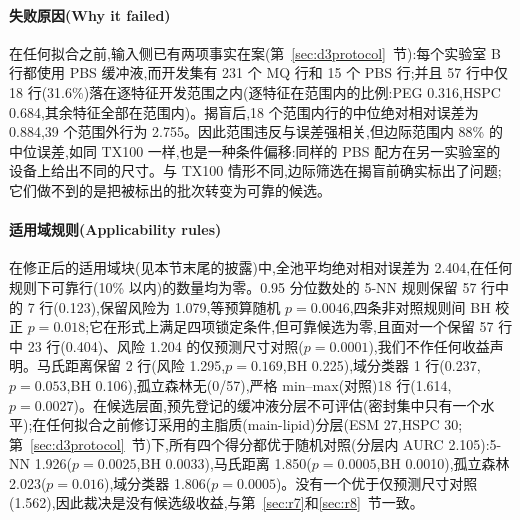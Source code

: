 \documentclass[11pt,a4paper]{ctexart}
\begin{document}
\paragraph{失败原因(Why it failed)} 在任何拟合之前,输入侧已有两项事实在案(第~\ref{sec:d3protocol}~节):每个实验室 B 行都使用 PBS 缓冲液,而开发集有 231 个 MQ 行和 15 个 PBS 行;并且 57 行中仅 18 行(31.6\%)落在逐特征开发范围之内(逐特征在范围内的比例:PEG 0.316,HSPC 0.684,其余特征全部在范围内)。揭盲后,18 个范围内行的中位绝对相对误差为 0.884,39 个范围外行为 2.755。因此范围违反与误差强相关,但边际范围内 88\% 的中位误差,如同 TX100 一样,也是一种条件偏移:同样的 PBS 配方在另一实验室的设备上给出不同的尺寸。与 TX100 情形不同,边际筛选在揭盲前确实标出了问题;它们做不到的是把被标出的批次转变为可靠的候选。

\paragraph{适用域规则(Applicability rules)} 在修正后的适用域块(见本节末尾的披露)中,全池平均绝对相对误差为 2.404,在任何规则下可靠行(10\% 以内)的数量均为零。0.95 分位数处的 5-NN 规则保留 57 行中的 7 行(0.123),保留风险为 1.079,等预算随机 $p=0.0046$,四条非对照规则间 BH 校正 $p=0.018$;它在形式上满足四项锁定条件,但可靠候选为零,且面对一个保留 57 行中 23 行(0.404)、风险 1.204 的仅预测尺寸对照($p=0.0001$),我们不作任何收益声明。马氏距离保留 2 行(风险 1.295,$p=0.169$,BH 0.225),域分类器 1 行(0.237,$p=0.053$,BH 0.106),孤立森林无(0/57),严格 min–max(对照)18 行(1.614,$p=0.0027$)。在候选层面,预先登记的缓冲液分层不可评估(密封集中只有一个水平);在任何拟合之前修订采用的主脂质(main-lipid)分层(ESM 27,HSPC 30;第~\ref{sec:d3protocol}~节)下,所有四个得分都优于随机对照(分层内 AURC 2.105):5-NN 1.926($p=0.0025$,BH 0.0033),马氏距离 1.850($p=0.0005$,BH 0.0010),孤立森林 2.023($p=0.016$),域分类器 1.806($p=0.0005$)。没有一个优于仅预测尺寸对照(1.562),因此裁决是没有候选级收益,与第~\ref{sec:r7}和\ref{sec:r8}~节一致。
\end{document}
